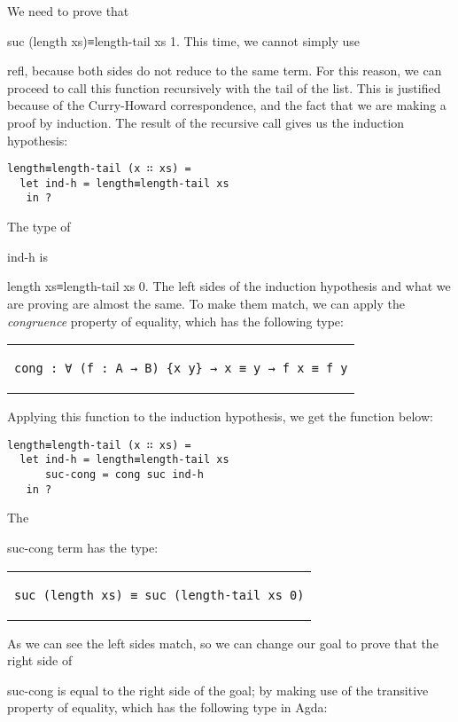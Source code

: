 \documentclass{cys}
\newcommand*{\SavedLstInline}{}
\DeclareRobustCommand*{\lstinline}{%
  \ifmmode
    \let\SavedBGroup\bgroup
    \def\bgroup{%
      \let\bgroup\SavedBGroup
      \hbox\bgroup
    }%
  \fi
  \SavedLstInline
  }
\begin{document}
We need to prove that \lstinline{suc (length xs)≡length-tail xs 1}. This time, we cannot
simply use \lstinline{refl}, because both sides do not reduce to the same term. For this
reason, we can proceed to call this function recursively with the tail of the list. This
is justified because of the Curry-Howard correspondence, and the fact that we are making
a proof by induction. The result of the recursive call gives us the induction hypothesis:

\begin{lstlisting}
length≡length-tail (x ∷ xs) =
  let ind-h = length≡length-tail xs
   in ?
\end{lstlisting}

The type of \lstinline{ind-h} is \lstinline{length xs≡length-tail xs 0}. The left sides
of the induction hypothesis and what we are proving are almost the same. To make them
match, we can apply the \emph{congruence} property of equality, which has the following
type:

\begin{center}
\begin{tabular}{c}
\begin{lstlisting}
cong : ∀ (f : A → B) {x y} → x ≡ y → f x ≡ f y
\end{lstlisting}
\end{tabular}
\end{center}

Applying this function to the induction hypothesis, we get the function below:

\begin{lstlisting}
length≡length-tail (x ∷ xs) =
  let ind-h = length≡length-tail xs
      suc-cong = cong suc ind-h
   in ?
\end{lstlisting}

The \lstinline{suc-cong} term has the type:

\begin{center}
\begin{tabular}{c}
\begin{lstlisting}
suc (length xs) ≡ suc (length-tail xs 0)
\end{lstlisting}
\end{tabular}
\end{center}

As we can see the left sides match, so we can change our goal to prove that the right
side of \lstinline{suc-cong} is equal to the right side of the goal; by making use of the
transitive property of equality, which has the following type in Agda:
\end{document}
